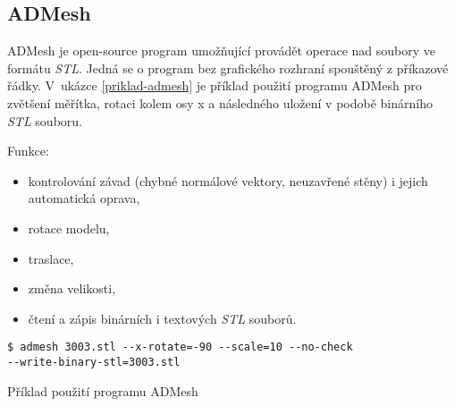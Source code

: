 \subsection{ADMesh}
ADMesh \autocite{ADMesh} je open-source program umožňující provádět operace nad soubory ve formátu \textit{\gls{STL}}. Jedná se o program bez grafického rozhraní spouštěný z příkazové řádky. V~ukázce \ref{priklad-admesh} je příklad použití programu ADMesh pro zvětšení měřítka, rotaci kolem osy x a následného uložení v podobě binárního \textit{\gls{STL}} souboru.

Funkce:
\begin{itemize}
    \item kontrolování závad (chybné normálové vektory, neuzavřené stěny) i jejich automatická oprava,
    \item rotace modelu,
    \item traslace,
    \item změna velikosti,
    \item čtení a zápis binárních i textových \textit{\gls{STL}} souborů.
\end{itemize}

\begin{listing}[htbp]
        \begin{verbatim}
$ admesh 3003.stl --x-rotate=-90 --scale=10 --no-check
--write-binary-stl=3003.stl
        \end{verbatim}
    \caption{Příklad použití programu ADMesh \label{priklad-admesh}}
\end{listing}
